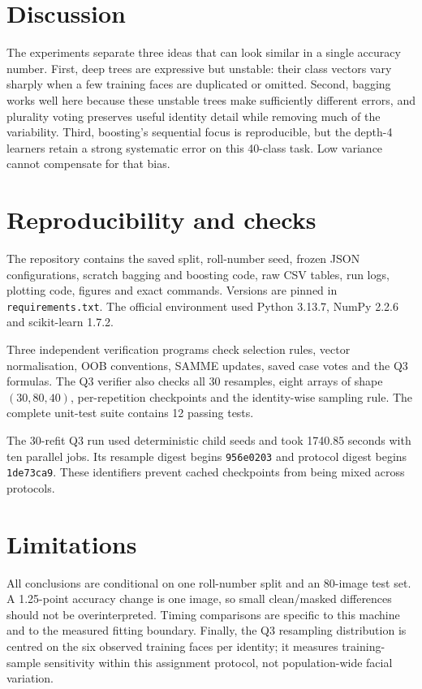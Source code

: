 \documentclass[10pt,twocolumn,letterpaper]{article}
\begin{document}
\section{Discussion}
The experiments separate three ideas that can look similar in a single accuracy number. First, deep trees are expressive but unstable: their class vectors vary sharply when a few training faces are duplicated or omitted. Second, bagging works well here because these unstable trees make sufficiently different errors, and plurality voting preserves useful identity detail while removing much of the variability. Third, boosting's sequential focus is reproducible, but the depth-4 learners retain a strong systematic error on this 40-class task. Low variance cannot compensate for that bias.

\clearpage
\section{Reproducibility and checks}
The repository contains the saved split, roll-number seed, frozen JSON configurations, scratch bagging and boosting code, raw CSV tables, run logs, plotting code, figures and exact commands. Versions are pinned in \texttt{requirements.txt}. The official environment used Python 3.13.7, NumPy 2.2.6 and scikit-learn 1.7.2.

Three independent verification programs check selection rules, vector normalisation, OOB conventions, SAMME updates, saved case votes and the Q3 formulas. The Q3 verifier also checks all 30 resamples, eight arrays of shape $(30,80,40)$, per-repetition checkpoints and the identity-wise sampling rule. The complete unit-test suite contains 12 passing tests.

The 30-refit Q3 run used deterministic child seeds and took 1740.85 seconds with ten parallel jobs. Its resample digest begins \texttt{956e0203} and protocol digest begins \texttt{1de73ca9}. These identifiers prevent cached checkpoints from being mixed across protocols.

\section{Limitations}
All conclusions are conditional on one roll-number split and an 80-image test set. A 1.25-point accuracy change is one image, so small clean/masked differences should not be overinterpreted. Timing comparisons are specific to this machine and to the measured fitting boundary. Finally, the Q3 resampling distribution is centred on the six observed training faces per identity; it measures training-sample sensitivity within this assignment protocol, not population-wide facial variation.
\end{document}
